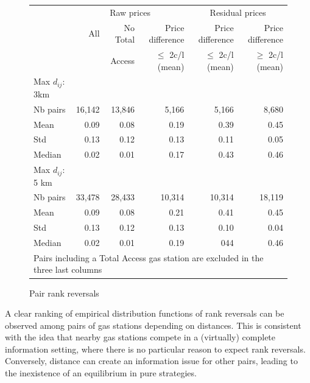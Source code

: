 \documentclass[11pt]{article}
\begin{document}
\begin{figure}
\caption{Pair rank reversals}
\centering
\begin{tabular}{lrrrrr}
\hline
{} & \multicolumn{3}{c}{Raw prices} & \multicolumn{2}{c}{Residual prices}  \\
{} & All & No Total & Price difference & Price difference & Price difference \\
{} & {} & Access & $\le$ 2c/l (mean) & $\le$ 2c/l (mean) & $\ge$ 2c/l (mean)\\
\hline
Max $d_{ij}$: 3km & {} & {} & {} & {} & {} \\
\hline
Nb pairs & 16,142 & 13,846 & 5,166 & 5,166 & 8,680 \\
Mean & 0.09 & 0.08 & 0.19 & 0.39 & 0.45 \\
Std & 0.13 & 0.12 & 0.13 & 0.11 & 0.05 \\
Median & 0.02 & 0.01 & 0.17 & 0.43 & 0.46 \\
\hline
Max $d_{ij}$: 5 km & {} & {} & {} & {} & {} \\
\hline
Nb pairs & 33,478 & 28,433 & 10,314 & 10,314 & 18,119 \\
Mean & 0.09 & 0.08 & 0.21 & 0.41 & 0.45 \\
Std & 0.13 & 0.12 & 0.13 & 0.10 & 0.04 \\
Median & 0.02 & 0.01 & 0.19 & 044 & 0.46 \\
\hline
\multicolumn{6}{l}{\small Pairs including a Total Access gas station are excluded in the three last columns}\\
\end{tabular}
\end{figure}

A clear ranking of empirical distribution functions of rank reversals can be observed among pairs of gas stations depending on distances. This is consistent with the idea that nearby gas stations compete in a (virtually) complete information setting, where there is no particular reason to expect rank reversals. Conversely, distance can create an information issue for other pairs, leading to the inexistence of an equilibrium in pure strategies.
\end{document}
